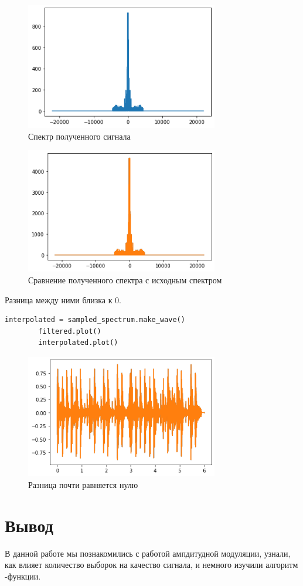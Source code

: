 \documentclass[a4paper, 12pt]{report}
\begin{document}
	\begin{figure}[H]
		\centering
		\includegraphics[width=0.75\textwidth]{task5.png}
		\caption{Спектр полученного сигнала}
		\label{fig:task5}
	\end{figure}
	\begin{figure}[H]
		\centering
		\includegraphics[width=0.75\textwidth]{task6.png}
		\caption{Сравнение полученного спектра с исходным спектром}
		\label{fig:task6}
	\end{figure}
	Разница между ними близка к 0.
	\begin{lstlisting}[language=Python,caption=Разница между интерполяцией и фильтрацией сигнала]
		interpolated = sampled_spectrum.make_wave()
		filtered.plot()
		interpolated.plot()
	\end{lstlisting}
	\begin{figure}[H]
		\centering
		\includegraphics[width=0.75\textwidth]{task7.png}
		\caption{Разница почти равняется нулю}
		\label{fig:task7}
	\end{figure}

	\chapter{Вывод}
	В данной работе мы познакомились с работой ампдитудной модуляции, узнали, как влияет количество выборок на качество сигнала, и немного изучили алгоритм -функции.
\end{document}

